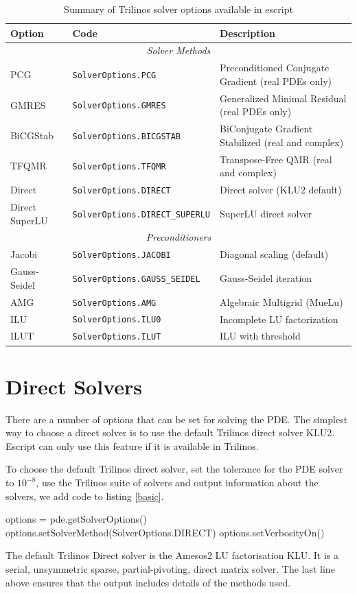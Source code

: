 \begin{table}[h]\center
\begin{tabular}{|l|l|l|}
\hline
\textbf{Option} & \textbf{Code} & \textbf{Description} \\
\hline
\multicolumn{3}{|c|}{\textit{Solver Methods}} \\
\hline
PCG & \verb|SolverOptions.PCG| & Preconditioned Conjugate Gradient (real PDEs only) \\
GMRES & \verb|SolverOptions.GMRES| & Generalized Minimal Residual (real PDEs only) \\
BiCGStab & \verb|SolverOptions.BICGSTAB| & BiConjugate Gradient Stabilized (real and complex) \\
TFQMR & \verb|SolverOptions.TFQMR| & Transpose-Free QMR (real and complex) \\
Direct & \verb|SolverOptions.DIRECT| & Direct solver (KLU2 default) \\
Direct SuperLU & \verb|SolverOptions.DIRECT_SUPERLU| & SuperLU direct solver \\
\hline
\multicolumn{3}{|c|}{\textit{Preconditioners}} \\
\hline
Jacobi & \verb|SolverOptions.JACOBI| & Diagonal scaling (default) \\
Gauss-Seidel & \verb|SolverOptions.GAUSS_SEIDEL| & Gauss-Seidel iteration \\
AMG & \verb|SolverOptions.AMG| & Algebraic Multigrid (MueLu) \\
ILU & \verb|SolverOptions.ILU0| & Incomplete LU factorization \\
ILUT & \verb|SolverOptions.ILUT| & ILU with threshold \\
\hline
\end{tabular}
\caption{Summary of Trilinos solver options available in escript}\label{tab:solver_summary}
\end{table}

\section{Direct Solvers}
There are a number of options that can be set for solving the PDE.  The simplest way to choose a direct solver is to use the default Trilinos direct solver KLU2.  Escript can only use this feature if it is available in Trilinos.

To choose the default Trilinos direct solver, set the tolerance for the PDE solver to $10^{-8}$,  use the Trilinos suite of solvers and output information about the solvers, we add code to listing \ref{basic}.
\begin{python}[caption=default Direct , label=defaultdirect ]
options = pde.getSolverOptions()
options.setSolverMethod(SolverOptions.DIRECT)
options.setVerbosityOn()
\end{python}
The default Trilinos Direct solver is the Amesos2 LU factorisation KLU. It is a serial, unsymmetric sparse, partial-pivoting, direct matrix solver.  The last line above ensures that the output includes details of the methods used.


